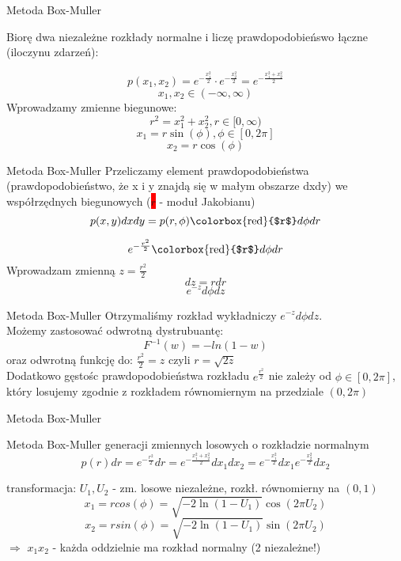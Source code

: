 \begin{frame}{Metoda Box-Muller}

		Biorę dwa niezależne rozkłady normalne i liczę prawdopodobieńswo 
		łączne (iloczynu zdarzeń):
		
		$$
			p(x_1,x_2) = e^{-\frac{x_1^{2}}{2}}\cdot e^{-\frac{x_2^{2}}{2}}=
			e^{-\frac{x_1^{2}+x_2^{2}}{2}}
		$$	
	    $$
		x_1, x_2 \in (-\infty,\infty)
		$$
		Wprowadzamy zmienne biegunowe:
		$$
		r^2=x_1^{2}+x_2^{2}, r \in[0,\infty)
		$$
		$$
		x_1=r\sin(\phi), \phi \in [0, 2\pi]
		$$
		$$
		x_2=r\cos(\phi)
		$$
\end{frame}
\begin{frame}{Metoda Box-Muller}
    Przeliczamy element prawdopodobieństwa (prawdopodobieństwo, że x i y  znajdą się w małym obszarze dxdy) we współrzędnych biegunowych (\colorbox{red}{$r$} - moduł Jakobianu)
$$
p(x,y)dxdy=p(r,\phi)
\textrm{\colorbox{red}{$r$}}
d\phi dr
$$

$$
e^{-\frac{r^2}{2}} \textrm{\colorbox{red}{$r$}} d\phi dr
$$
Wprowadzam zmienną $z=\frac{r^2}{2}$
$$
dz=rdr
$$
$$
e^{-z}  d\phi dz
$$
\end{frame}
\begin{frame}{Metoda Box-Muller }
    Otrzymaliśmy rozkład wykładniczy $e^{-z}  d\phi dz$.\\
    Możemy zastosować odwrotną dystrubuantę:
    $$
F^{-1}(w)=-ln(1-w)
$$
oraz odwrotną funkcję do:
$\frac{r^2}{2}=z$ czyli $r=\sqrt{2z} $\\
    Dodatkowo gęstośc prawdopodobieństwa rozkładu $ e^{\frac{r^2}{2}}$  nie zależy od $\phi \in [0,2\pi]$, który losujemy zgodnie z rozkładem równomiernym na przedziale $(0,2\pi)$
\end{frame}
\begin{frame}{Metoda Box-Muller}
	\begin{block}{Metoda Box-Muller  generacji zmiennych losowych o rozkładzie normalnym}
		\[
			p(r)dr = e^{-\frac{r^{2}}{2}}dr= e^{-\frac{x_1^{2}+x_2^2}{2}}dx_1dx_2=
			e^{-\frac{x_1^{2}}{2}}dx_1 e^{-\frac{x_2^{2}}{2}}dx_2
		\]
	\end{block}

	\begin{block}{transformacja:}
		$U_{1}, U_{2}$ - zm. losowe niezależne, rozkł. równomierny na $(0, 1)$
		\[
			x_{1} = r cos(\phi)=\sqrt{-2 \ln(1-U_1)} \cos(2\pi U_2)
		\]
		\[
			x_{2} = r sin(\phi)= \sqrt{-2 \ln(1-U_1)} \sin(2\pi U_2)
		\]
			$\Rightarrow$ $x_{1} x_{2}$ - każda oddzielnie ma rozkład normalny (2 niezależne!)
	\end{block}
\end{frame}
	
